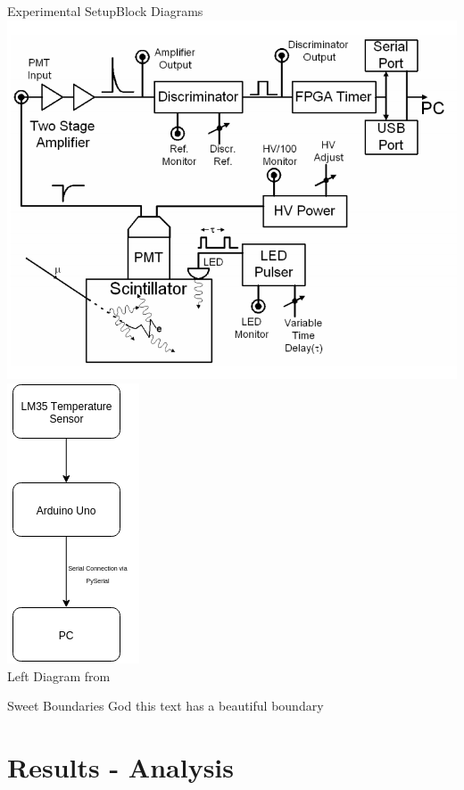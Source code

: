 \documentclass{beamer}
\begin{document}
\begin{frame}{Experimental SetupBlock Diagrams}
\centering
\includegraphics[scale=.25]{../Figures/MuonBlockDiagram.png}
\includegraphics[scale=.5]{../Figures/temperatureBlockDiagram.png}\\
\tiny{Left Diagram from \cite{muonPhysics}}
\begin{block}{Sweet Boundaries}
God this text has a beautiful boundary
\end{block}

\end{frame}


\section{Results - Analysis}
\end{document}
